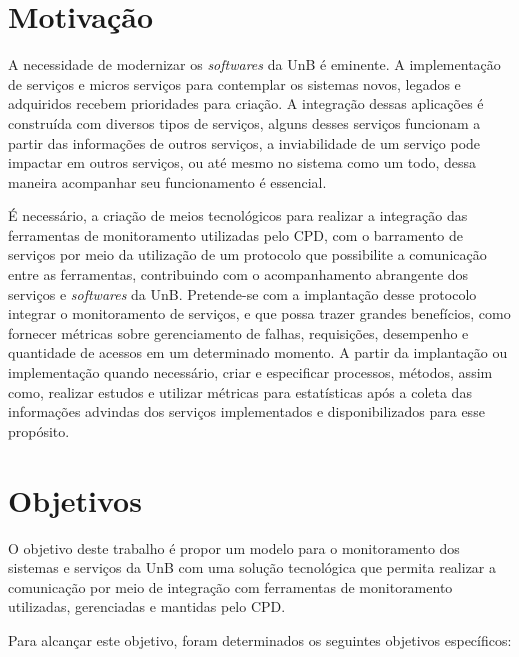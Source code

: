 
\section{Motivação}

A necessidade de modernizar os \textit{softwares} da \acrshort{UnB} é eminente. A implementação de serviços e micros serviços para contemplar os sistemas novos, legados e adquiridos recebem prioridades para criação. A integração dessas aplicações é construída com diversos tipos de serviços, alguns desses serviços funcionam a partir das informações de outros serviços, a inviabilidade de um serviço pode impactar em outros serviços, ou até mesmo no sistema como um todo, dessa maneira acompanhar seu funcionamento é essencial.      

É necessário, a criação de meios tecnológicos para realizar a integração das ferramentas de monitoramento utilizadas pelo \acrshort{CPD}, com o barramento de serviços por meio da utilização de um protocolo que possibilite a comunicação entre as ferramentas, contribuindo com o acompanhamento abrangente dos serviços e \textit{softwares} da \acrshort{UnB}. Pretende-se com a implantação desse protocolo integrar o monitoramento de serviços, e que possa trazer grandes benefícios, como fornecer métricas sobre gerenciamento de falhas, requisições, desempenho e quantidade de acessos em um determinado momento. A partir da implantação ou implementação quando necessário, criar e especificar processos, métodos, assim como, realizar estudos e utilizar métricas para estatísticas após a coleta das informações advindas dos serviços implementados e disponibilizados para esse propósito.



\section{Objetivos}
\label{objetivos}

O objetivo deste trabalho é propor um modelo para o monitoramento dos sistemas e serviços da \acrfull{UnB} com uma solução tecnológica que permita realizar a comunicação por meio de integração com ferramentas de monitoramento utilizadas, gerenciadas e mantidas pelo \acrfull{CPD}.

Para alcançar este objetivo, foram determinados os seguintes objetivos específicos:

